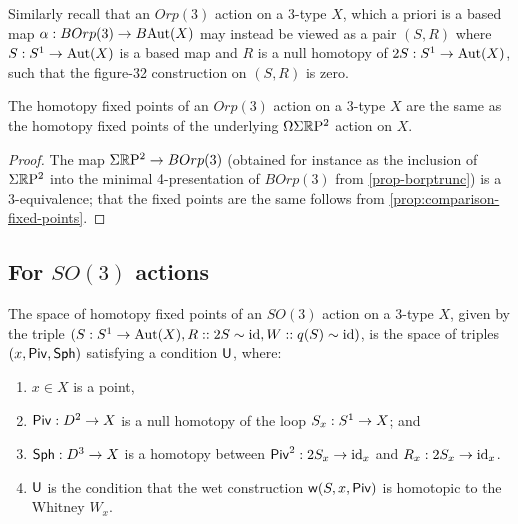 \documentclass{amsart}
\begin{document}
Similarly recall that an $Orp(3)$ action on a 3-type $X$, which a priori is a based map $\alpha: BOrp(3) \rightarrow B\mathrm{Aut}(X)$ may instead be viewed as a pair $(S,R)$ where $S : S^1 \rightarrow \mathrm{Aut}(X)$ is a based map and $R$ is a null homotopy of $2S : S^1 \rightarrow \mathrm{Aut}(X)$, such that the figure-32 construction on $(S,R)$ is zero.

\begin{proposition} 
\label{prop-quadvs2fp}
The homotopy fixed points of an $Orp(3)$ action on a 3-type $X$ are the same as the homotopy fixed points of the underlying $\Omega \Sigma \mathbb R \mathrm{P}^2$ action on $X$.
\end{proposition}

\begin{proof}
The map $\Sigma \mathbb R \mathrm{P}^2 \rightarrow BOrp(3)$ (obtained for instance as the inclusion of $\Sigma \mathbb R \mathrm{P}^2$ into the minimal 4-presentation of $BOrp(3)$ from \cref{prop-borptrunc}) is a 3-equivalence; that the fixed points are the same follows from \cref{prop:comparison-fixed-points}.
\end{proof}

\subsection{For $SO(3)$ actions}

\begin{theorem}
The space of homotopy fixed points of an $SO(3)$ action on a 3-type $X$, given by the triple $(S: S^1 \rightarrow \mathrm{Aut}(X),R:: 2 S \sim \mathrm{id},W:: q(S) \sim \mathrm{id})$, is the space of triples $(x, \mathsf{Piv}, \mathsf{Sph})$ satisfying a condition $\mathsf{U}$, where:
\begin{enumerate}
\item $x \in X$ is a point,
\item $\mathsf{Piv}: D^2 \rightarrow X$ is a null homotopy of the loop $S_x: S^1 \rightarrow X$; and
\item $\mathsf{Sph}: D^3 \rightarrow X$ is a homotopy between $\mathsf{Piv}^2 : 2 S_x \rightarrow \mathrm{id}_x$ and $R_x: 2 S_x \rightarrow \mathrm{id}_x$.
\item $\mathsf{U}$ is the condition that the wet construction $\mathsf{w}(S,x,\mathsf{Piv})$ is homotopic to the Whitney $W_x$.
\end{enumerate}
\end{theorem}
\end{document}
